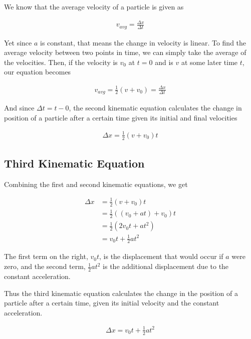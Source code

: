 \documentclass[11pt]{article}
\begin{document}
We know that the average velocity of a particle is given as

\begin{align*}
    v_{avg} = \frac{\Delta x}{\Delta t}
\end{align*}

Yet since $a$ is constant, that means the change in velocity is linear. To find the average velocity between two points in time, we can simply take the average of the velocities. Then, if the velocity is $v_{0}$ at $t = 0$ and is $v$ at some later time $t$, our equation becomes

\begin{align*}
    v_{avg} = \frac{1}{2}(v + v_{0}) = \frac{\Delta x}{\Delta t}
\end{align*}

And since $\Delta t = t - 0$, the second kinematic equation calculates the change in position of a particle after a certain time given its initial and final velocities

\begin{align*}
    \Delta x = \frac{1}{2}(v + v_{0})t
\end{align*}

\subsection{Third Kinematic Equation}

Combining the first and second kinematic equations, we get

\begin{align*}
    \Delta x &= \frac{1}{2}(v + v_{0})t \\
             &= \frac{1}{2}((v_{0} + at) + v_{0})t \\
             & = \frac{1}{2}(2v_{0}t + at^{2}) \\
             & = v_{0}t + \frac{1}{2}at^{2}
\end{align*}

The first term on the right, $v_{0}t$, is the displacement that would occur if $a$ were zero, and the second term, $\frac{1}{2}at^{2}$ is the additional displacement due to the constant acceleration.

Thus the third kinematic equation calculates the change in the position of a particle after a certain time, given its initial velocity and the constant acceleration.

\begin{align*}
    \Delta x = v_{0}t + \frac{1}{2}at^{2}
\end{align*}
\end{document}
